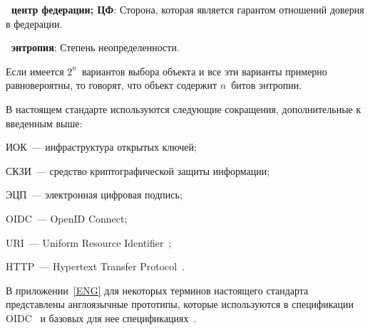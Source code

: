 

{\bf \thedefctr~центр федерации; ЦФ}:
Сторона, которая является гарантом отношений доверия в федерации.


{\bf \thedefctr~энтропия}:
Степень неопределенности. 

\begin{note*}
Если имеется $2^n$~вариантов выбора объекта и все эти варианты примерно
равновероятны, то говорят, что объект содержит $n$~битов энтропии.
\end{note*}

В настоящем стандарте используются следующие сокращения, дополнительные к 
введенным выше:

ИОК~--- инфраструктура открытых ключей;

СКЗИ~--- средство криптографической защиты информации;

ЭЦП~--- электронная цифровая подпись;

OIDC~--- OpenID Connect;

URI~--- Uniform Resource Identifier~\cite{RFC3986};

HTTP~--- Hypertext Transfer Protocol~\cite{RFC3986}.

В приложении~\ref{ENG} для некоторых терминов настоящего стандарта 
представлены англоязычные прототипы, которые используются в 
спецификации OIDC~\cite{OIDC} и базовых для нее 
спецификациях~\cite{RFC6749,RFC6750}.


